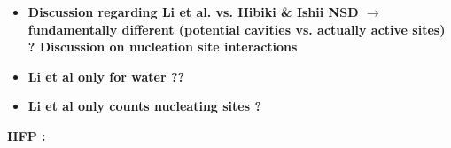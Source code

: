 \documentclass[8pt, a4paper]{article}
\begin{document}
\begin{itemize}
\item \textbf{Discussion regarding Li et al. vs. Hibiki \& Ishii NSD $\rightarrow$ fundamentally different (potential cavities vs. actually active sites) ? Discussion on nucleation site interactions}



\item \textbf{Li et al only for water ?? }



\item \textbf{Li et al only counts nucleating sites ?}



\end{itemize}


\textbf{HFP : }
\end{document}
